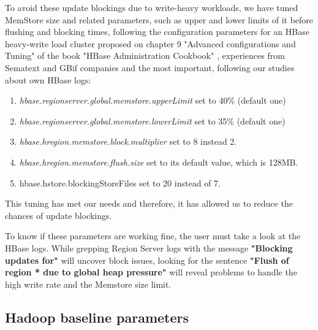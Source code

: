 \begin{enumerate}
To avoid these update blockings due to write-heavy workloads, we have tuned MemStore size and related parameters, such as upper and lower limits of it before flushing and blocking times, following the configuration parameters for an HBase heavy-write load cluster proposed on chapter 9 "Advanced configurations and Tuning" of the book "HBase Administration Cookbook" \cite{jiang2012hbase}, experiences from Sematext \cite{MemstoreSematext} and GBif companies \cite{MemstoreGBif} and the most important, following our studies about own HBase logs:
\bigskip
\begin{enumerate}
\item \textit{hbase.regionserver.global.memstore.upperLimit} set to 40\% (default one)
\item \textit{hbase.regionserver.global.memstore.lowerLimit} set to 35\% (default one)
\item \textit{hbase.hregion.memstore.block.multiplier} set to 8 instead 2.
\item \textit{hbase.hregion.memstore.flush.size} set to its default value, which is 128MB.
\item {hbase.hstore.blockingStoreFiles} set to 20 instead of 7.
\end{enumerate}

This tuning has met our needs and therefore, it has allowed us to reduce the chances of update blockings.
\par
To know if these parameters are working fine, the user must take a look at the HBase logs. While grepping Region Server logs with the message \textbf{"Blocking updates for"} will uncover block issues, looking for the sentence \textbf{"Flush of region * due to global heap pressure"} will reveal problems to handle the high write rate and the Memstore size limit.


\end{enumerate}


\subsection{Hadoop baseline parameters}

